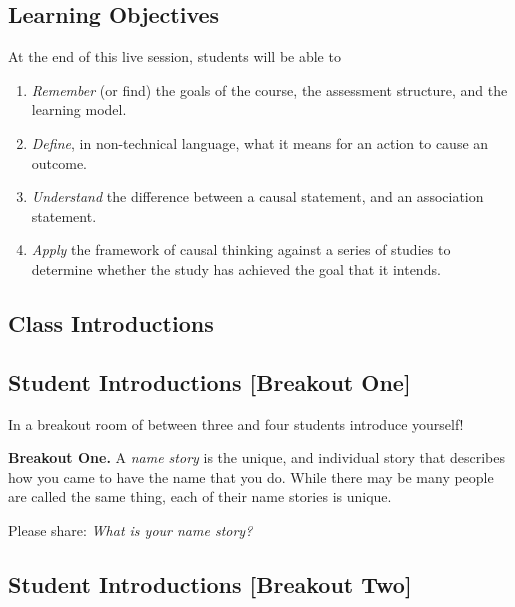 \documentclass[
]{article}
\providecommand{\tightlist}{%
  \setlength{\itemsep}{0pt}\setlength{\parskip}{0pt}}
\begin{document}
\hypertarget{learning-objectives}{%
\subsection{Learning Objectives}\label{learning-objectives}}

At the end of this live session, students will be able to

\begin{enumerate}
\def\labelenumi{\arabic{enumi}.}
\tightlist
\item
  \emph{Remember} (or find) the goals of the course, the assessment structure, and the learning model.
\item
  \emph{Define}, in non-technical language, what it means for an action to cause an outcome.
\item
  \emph{Understand} the difference between a causal statement, and an association statement.
\item
  \emph{Apply} the framework of causal thinking against a series of studies to determine whether the study has achieved the goal that it intends.
\end{enumerate}

\hypertarget{class-introductions}{%
\subsection{Class Introductions}\label{class-introductions}}

\hypertarget{student-introductions-breakout-one}{%
\subsection{Student Introductions {[}Breakout One{]}}\label{student-introductions-breakout-one}}

In a breakout room of between three and four students introduce yourself!

\begin{breakout}
\textbf{Breakout One.} A \emph{name story} is the unique, and individual story that describes how you came to have the name that you do. While there may be many people are called the same thing, each of their name stories is unique.

Please share: \emph{What is your name story?}

\end{breakout}

\hypertarget{student-introductions-breakout-two}{%
\subsection{Student Introductions {[}Breakout Two{]}}\label{student-introductions-breakout-two}}
\end{document}
